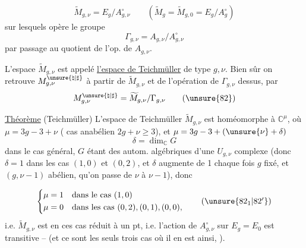 
\[
 \widetilde M_{g,\nu}=E_g/A_{g,\nu}^{\circ}
 \qquad
 (\widetilde M_g=\widetilde M_{g,0}=E_g/A_g^{\circ})
 \tag{81}
\]
sur lesquels opère le groupe 
\[
 \Gamma_{g,\nu}=A_{g,\nu}/A_{g,\nu}^{\circ}
\]
par passage au quotient de l'op. de \(A_{g,\nu}\).

 L'espace \(\widetilde M_{g,\nu}\)  est appelé \uline{l'espace de Teichmüller} de type \(g,\nu\). Bien sûr on retrouve \(M_{g,\nu}^{\unsure{\natural|\sharp}}\) à partir de \(\widetilde M_{g,\nu}\) et  de l'opération de \(\Gamma_{g,\nu}\) dessus, par
\[
 M_{g,\nu}^{\unsure{\natural|\sharp}}=\widetilde M_{g,\nu}/\Gamma_{g,\nu}
 \tag{\unsure{82}}
\]

\uline{Théorème} (Teichmüller) L'espace de Teichmüller \(\widetilde M_{g,\nu}\) est homéomorphe à  \(\mathbb C^\mu\), où \(\mu=3g-3+\nu\) ( cas anabélien \(2g+\nu\geq 3\)), et \(\mu=3g-3+(\unsure{\nu}+\delta)\)
\[
 \delta=\dim_{\mathbb C}G
\]
dans le cas général, \(G\) étant  des autom. algébriques d'une \(U_{g,\nu}\) complexe (donc \(\delta=1\) dans les cas  \((1,0)\) et \((0,2)\), et  \(\delta\) augmente de 1 chaque fois  \(g\) fixé, et \((g,\nu-1)\) abélien, qu'on passe de \(\nu\) à \(\nu-1\)), donc



\[
 \left\{
 \begin{aligned}
 \mu&=1\quad\text{dans le cas }(1,0)\\
 \mu&=0\quad\text{dans les cas }(0,2),(0,1),(0,0),
 \end{aligned}
 \right.
 \tag{\unsure{\(82_1\)|\(82'\)}}
\]
i.e. \(\widetilde M_{g,\nu}\) est en ces cas réduit à un pt, i.e. l'action de \(A_{g,\nu}^{\circ}\) sur \(E_g=E_0\) est  transitive -- (et ce sont  les seuls trois cas où il en est ainsi, ).


